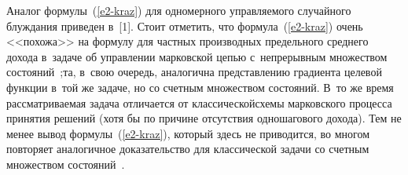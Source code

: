 \begin{multicols}{2}
Аналог формулы~(\ref{e2-kraz}) для одномерного управ\-ля\-емо\-го случайного 
блуждания приведен в~[1]. Стоит отметить, что формула~(\ref{e2-kraz}) очень 
<<похожа>> на формулу для част\-ных производных предельного сред\-не\-го 
дохода в~задаче об управ\-ле\-нии марковской цепью с~непрерывным 
множеством со\-сто\-яний~\cite{28-kraz};\linebreak та, в~свою очередь, аналогична 
пред\-став\-ле\-нию градиента целевой функции в~той же задаче, но со счетным 
множеством со\-сто\-яний. В~то же время рас\-смат\-ри\-ва\-емая задача отличается от 
классической\linebreak схемы марковского процесса принятия решений (хотя бы по 
причине отсутствия одношагового дохода). Тем не менее вывод 
формулы~(\ref{e2-kraz}), который здесь не приводится, во многом повторяет 
аналогичное доказательство для классической задачи со счет\-ным 
множеством со\-сто\-яний~\cite{29-kraz}. 

\begin{figure*}[b] %
\vspace*{3pt}
  \begin{center}  
    \mbox{%
\epsfxsize=163mm
}
\end{center}
\vspace*{-9pt}
\vspace*{18pt}
  \begin{center}  
    \mbox{%
\epsfxsize=163mm
}
\end{center}
\vspace*{-9pt}
\end{figure*}
  

\end{multicols}
